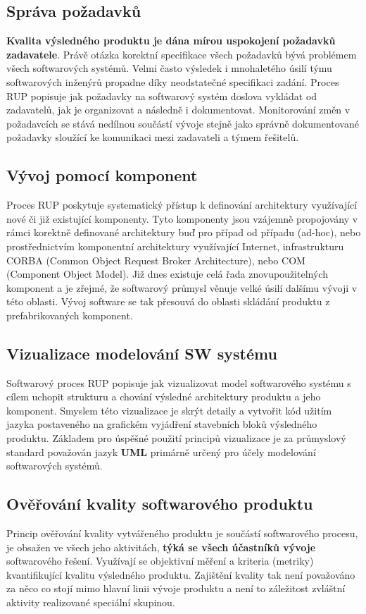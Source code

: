 \subsection{Správa požadavků}
\textbf{Kvalita výsledného produktu je dána mírou uspokojení požadavků zadavatele}. Právě otázka korektní specifikace všech požadavků bývá problémem všech softwarových systémů. Velmi často výsledek i mnohaletého úsilí týmu softwarových inženýrů propadne díky neodstatečné specifikaci zadání. Proces RUP popisuje jak požadavky na softwarový systém doslova vykládat od zadavatelů, jak je organizovat a následně i dokumentovat. Monitorování změn v požadavcích se stává nedílnou součástí vývoje stejně jako správně dokumentované požadavky sloužící ke komunikaci mezi zadavateli a týmem řešitelů.

\subsection{Vývoj pomocí komponent}
Proces RUP poskytuje systematický přístup k definování architektury využívající nové či již existující komponenty. Tyto komponenty jsou vzájemně propojovány v rámci korektně definované architektury buď pro případ od případu (ad-hoc), nebo prostřednictvím komponentní architektury využívající Internet, infrastrukturu CORBA (Common Object Request Broker Architecture), nebo COM (Component Object Model). Již dnes existuje celá řada znovupoužitelných komponent a je zřejmé, že softwarový průmysl věnuje velké úsilí dalšímu vývoji v této oblasti. Vývoj software se tak přesouvá do oblasti skládání produktu z prefabrikovaných komponent.

\subsection{Vizualizace modelování SW systému}
Softwarový proces RUP popisuje jak vizualizovat model softwarového systému s cílem uchopit strukturu a chování výsledné architektury produktu a jeho komponent. Smyslem této vizualizace je skrýt detaily a vytvořit kód užitím jazyka postaveného na grafickém vyjádření stavebních bloků výsledného produktu. Základem pro úspěšné použití principů vizualizace je za průmyslový standard považován jazyk \textbf{UML} primárně určený pro účely modelování softwarových systémů.

\subsection{Ověřování kvality softwarového produktu}
Princip ověřování kvality vytvářeného produktu je součástí softwarového procesu, je obsažen ve všech jeho aktivitách, \textbf{týká se všech účastníků vývoje} softwarového řešení. Využívají se objektivní měření a kriteria (metriky) kvantifikující kvalitu výsledného produktu. Zajištění kvality tak není považováno za něco co stojí mimo hlavní linii vývoje produktu a není to záležitost zvláštní aktivity realizované speciální skupinou.

